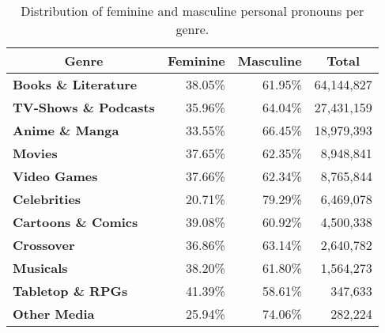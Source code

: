 \begin{table}[htb]
    \renewcommand{\arraystretch}{1.25}
    \centering
    \begin{tabular}{lrrr}
        \toprule
        \multicolumn{1}{c}{\textbf{Genre}} &
        \multicolumn{1}{c}{\textbf{Feminine}} &
        \multicolumn{1}{c}{\textbf{Masculine}} &
        \multicolumn{1}{c}{\textbf{Total}} \\
        \midrule
        \textbf{Books \& Literature}  & \cellcolor[HTML]{F980F6}38.05\% & \cellcolor[HTML]{8DB4F0}61.95\% & 64,144,827 \\
        \textbf{TV-Shows \& Podcasts} & \cellcolor[HTML]{FA8BF6}35.96\% & \cellcolor[HTML]{8AB1EF}64.04\% & 27,431,159 \\
        \textbf{Anime \& Manga}       & \cellcolor[HTML]{FB98F6}33.55\% & \cellcolor[HTML]{85AEEF}66.45\% & 18,979,393 \\
        \textbf{Movies}               & \cellcolor[HTML]{F982F6}37.65\% & \cellcolor[HTML]{8DB3F0}62.35\% & 8,948,841  \\
        \textbf{Video Games}          & \cellcolor[HTML]{F982F6}37.66\% & \cellcolor[HTML]{8DB3F0}62.34\% & 8,765,844  \\
        \textbf{Celebrities}          & \cellcolor[HTML]{FFDDF5}20.71\% & \cellcolor[HTML]{6D9EEB}79.29\% & 6,469,078  \\
        \textbf{Cartoons \& Comics}   & \cellcolor[HTML]{F87AF6}39.08\% & \cellcolor[HTML]{8FB5F0}60.92\% & 4,500,338  \\
        \textbf{Crossover}            & \cellcolor[HTML]{F986F6}36.86\% & \cellcolor[HTML]{8BB2F0}63.14\% & 2,640,782  \\
        \textbf{Musicals}             & \cellcolor[HTML]{F97FF6}38.20\% & \cellcolor[HTML]{8EB4F0}61.80\% & 1,564,273  \\
        \textbf{Tabletop \& RPGs}     & \cellcolor[HTML]{F76DF7}41.39\% & \cellcolor[HTML]{94B8F1}58.61\% & 347,633    \\
        \textbf{Other Media}          & \cellcolor[HTML]{FDC1F5}25.94\% & \cellcolor[HTML]{77A5ED}74.06\% & 282,224    \\
        \bottomrule
    \end{tabular}
    \caption[Distribution of feminine and masculine personal pronouns per genre.]{Distribution of feminine and masculine personal pronouns per genre.}
    \label{tab:pronouns-distribution}
\end{table}

